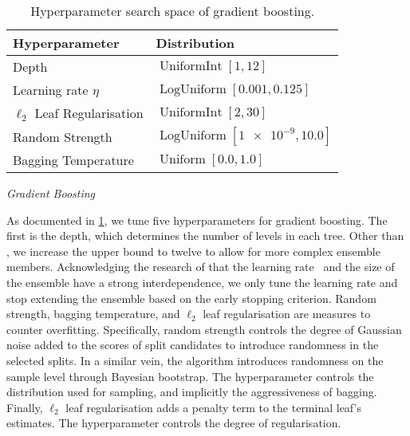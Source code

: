 \begin{table}[H]
    \centering
    \caption[Hyperparameter Search Space of Gradient Boosting]{Hyperparameter search space of gradient boosting.}
    \label{tab:hyperparameter-space-gbm}
    \begin{tabular}{@{}ll@{}}
        \toprule
        Hyperparameter               & Distribution                                  \\ \midrule
        Depth                        & $\operatorname{UniformInt}[1,12]$             \\
        Learning rate $\eta$         & $\operatorname{LogUniform}[0.001, 0.125]$     \\
        $\ell_2$ Leaf Regularisation & $\operatorname{UniformInt}[2, 30]$            \\
        Random Strength              & $\operatorname{LogUniform}[\num{1e-9}, 10.0]$ \\
        Bagging Temperature          & $\operatorname{Uniform}[0.0, 1.0]$            \\ \bottomrule
    \end{tabular}
\end{table}


\emph{Gradient Boosting}

As documented in \cref{tab:hyperparameter-space-gbm}, we tune five hyperparameters for gradient boosting. The first is the depth, which determines the number of levels in each tree. Other than \textcite[][]{gorishniyRevisitingDeepLearning2021}, we increase the upper bound to twelve to allow for more complex ensemble members. Acknowledging the research of \textcite[][14]{friedmanGreedyFunctionApproximation2001} that the learning rate \eta~and the size of the ensemble have a strong interdependence, we only tune the learning rate and stop extending the ensemble based on the early stopping criterion. Random strength, bagging temperature, and $\ell_2$ leaf regularisation are measures to counter overfitting. Specifically, random strength controls the degree of Gaussian noise added to the scores of split candidates to introduce randomness in the selected splits. In a similar vein, the algorithm introduces randomness on the sample level through Bayesian bootstrap. The hyperparameter controls the distribution used for sampling, and implicitly the aggressiveness of bagging. Finally, $\ell_2$ leaf regularisation adds a penalty term to the terminal leaf's estimates. The hyperparameter controls the degree of regularisation.


